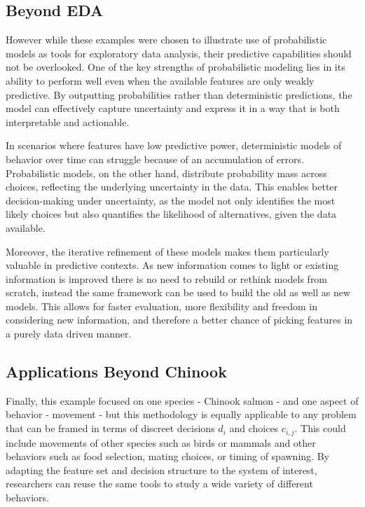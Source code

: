 \documentclass[11pt]{article}
\begin{document}
\subsection*{Beyond EDA}

However while these examples were chosen to illustrate use of probabilistic models as tools for exploratory data analysis, their predictive capabilities should not be overlooked. One of the key strengths of probabilistic modeling lies in its ability to perform well even when the available features are only weakly predictive. By outputting probabilities rather than deterministic predictions, the model can effectively capture uncertainty and express it in a way that is both interpretable and actionable.

In scenarios where features have low predictive power, deterministic models of behavior over time can struggle because of an accumulation of errors. Probabilistic models, on the other hand, distribute probability mass across choices, reflecting the underlying uncertainty in the data. This enables better decision-making under uncertainty, as the model not only identifies the most likely choices but also quantifies the likelihood of alternatives, given the data available.

Moreover, the iterative refinement of these models makes them particularly valuable in predictive contexts. As new information comes to light or existing information is improved there is no need to rebuild or rethink models from scratch, instead the same framework can be used to build the old as well as new models. This allows for faster evaluation, more flexibility and freedom in considering new information, and therefore a better chance of picking features in a purely data driven manner. 

\subsection*{Applications Beyond Chinook}

Finally, this example focused on one species - Chinook salmon - and one aspect of behavior - movement - but this methodology is equally applicable to any problem that can be framed in terms of discreet decisions $d_i$ and choices $c_{i,j}$. This could include movements of other species such as birds or mammals and other behaviors such as food selection, mating choices, or timing of spawning. By adapting the feature set and decision structure to the system of interest, researchers can reuse the same tools to study a wide variety of different behaviors. 
\end{document}
